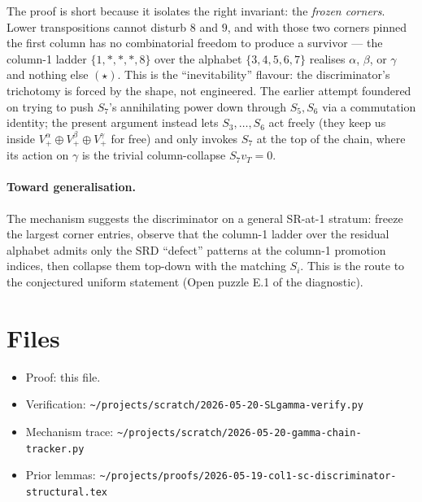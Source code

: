 \documentclass[11pt]{article}
\newcommand{\Va}{V_{+}^{\alpha}}
\newcommand{\Vb}{V_{+}^{\beta}}
\newcommand{\Vg}{V_{+}^{\gamma}}
\begin{document}
The proof is short because it isolates the right invariant: the
\emph{frozen corners}. Lower transpositions cannot disturb $8$ and $9$, and
with those two corners pinned the first column has no combinatorial freedom to
produce a survivor --- the column-1 ladder $\{1,\ast,\ast,\ast,8\}$ over the
alphabet $\{3,4,5,6,7\}$ realises $\alpha$, $\beta$, or $\gamma$ and nothing
else $(\star)$. This is the ``inevitability'' flavour: the discriminator's
trichotomy is forced by the shape, not engineered. The earlier attempt foundered
on trying to push $S_7$'s annihilating power down through $S_5,S_6$ via a
commutation identity; the present argument instead lets $S_3,\dots,S_6$ act
freely (they keep us inside $\Va\oplus\Vb\oplus\Vg$ for free) and only invokes
$S_7$ at the top of the chain, where its action on $\gamma$ is the trivial
column-collapse $S_7 v_T=0$.

\paragraph{Toward generalisation.} The mechanism suggests the discriminator on a
general SR-at-1 stratum: freeze the largest corner entries, observe that the
column-1 ladder over the residual alphabet admits only the SRD ``defect''
patterns at the column-1 promotion indices, then collapse them top-down with the
matching $S_i$. This is the route to the conjectured uniform statement
(Open puzzle E.1 of the diagnostic).

\section*{Files}
\begin{itemize}
\item Proof: this file.
\item Verification: \texttt{\textasciitilde/projects/scratch/2026-05-20-SLgamma-verify.py}
\item Mechanism trace: \texttt{\textasciitilde/projects/scratch/2026-05-20-gamma-chain-tracker.py}
\item Prior lemmas: \texttt{\textasciitilde/projects/proofs/2026-05-19-col1-sc-discriminator-structural.tex}
\end{itemize}
\end{document}

